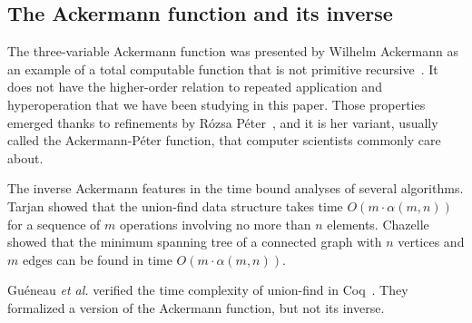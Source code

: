 \subsection{The Ackermann function and its inverse}
The three-variable Ackermann function was presented by
Wilhelm Ackermann as an example of a total computable function that
is not primitive recursive~\cite{ackermann}.
It does not have the higher-order
relation to repeated application and hyperoperation that we have been studying in
this paper. Those properties emerged thanks to refinements by Rózsa Péter~\cite{peter},
and it is her variant, usually called the Ackermann-Péter function,
that computer scientists commonly care about.

The inverse Ackermann
features in the time bound analyses of several algorithms.
Tarjan \cite{tarjan} showed that the union-find data structure
takes time $O(m\cdot\alpha(m,n))$ for a sequence of $m$ operations
involving no more than $n$ elements.
Chazelle \cite{chazelle} showed that the minimum spanning tree
of a connected graph with $n$ vertices and $m$ edges
can be found in time $O(m\cdot\alpha(m,n))$.

Gu\'eneau \emph{et al.}
verified the time complexity of union-find in Coq~\cite{gueneauetal}.
They formalized a version of the Ackermann function, but not its inverse.


